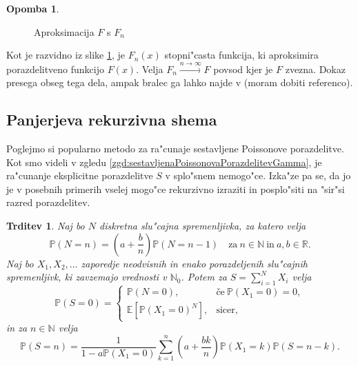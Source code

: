 \documentclass[12pt, a4paper, reqno]{amsart}
\theoremstyle{definition}
\newtheorem{opomba}[definicija]{Opomba}
\theoremstyle{plain}
\newtheorem{trditev}[definicija]{Trditev}
\newcommand{\R}{\mathbb{R}}
\newcommand{\N}{\mathbb{N}}
\newcommand{\E}{\mathbb{E}}
\newcommand{\Prob}{\mathbb{P}}
\newcommand{\1}{\mathds{1}}
\begin{document}
\begin{opomba}
\begin{figure}[H]
\begin{center}
\begin{tikzpicture}
                
                
                \end{tikzpicture}
                \caption{Aproksimacija $F$ s $F_n$}
                \label{fig:slika2}
            \end{center}
        \end{figure}

    \noindent
    Kot je razvidno iz slike \ref{fig:slika2}, je $F_n(x)$ stopni"casta funkcija, ki aproksimira 
    porazdelitveno funkcijo $F(x)$. Velja $F_n \xrightarrow{n\to\infty}F$ povsod kjer je $F$ zvezna.
    Dokaz presega obseg tega dela, ampak bralec ga lahko najde v \cite{4} (moram dobiti referenco).
    \label{op:aproksimacijaZDiskretno}
    \end{opomba}



    \subsection{Panjerjeva rekurzivna shema}
    Poglejmo si popularno metodo za ra"cunaje sestavljene Poissonove porazdelitve. Kot
    smo videli v zgledu \ref{zgd:sestavljenaPoissonovaPorazdelitevGamma}, je ra"cunanje eksplicitne 
    porazdelitve $S$ v splo"snem nemogo"ce. Izka"ze pa se, da jo je v posebnih primerih vselej mogo"ce
    rekurzivno izraziti in posplo"siti na "sir"si razred porazdelitev.

    \begin{trditev}
        Naj bo $N$ diskretna slu"cajna spremenljivka, za katero velja 
        \begin{equation*}
            \Prob(N = n) = \left(a + \frac{b}{n}\right)\Prob\left(N = n-1\right) \quad \text{za} \ n\in\N \ \text{in} \ a, b \in \R.
        \end{equation*}
        Naj bo $X_1, X_2, \dots$ zaporedje neodvisnih in enako porazdeljenih slu"cajnih spremenljivk, ki 
        zavzemajo vrednosti v $\N_0$. Potem za $S = \sum_{i=1}^NX_i$ velja
        \begin{equation*}
        \Prob\left(S = 0\right) = 
        \begin{cases}
            \Prob\left(N = 0\right), & \text{če} \ \Prob(X_1 = 0) = 0, \\  
            \E\left[\Prob\left(X_1 = 0\right)^N\right], & \text{sicer}, 
        \end{cases}
        \end{equation*}
        in za $n\in\N$ velja
        \begin{equation}
            \Prob\left(S = n\right) = \frac{1}{1 - a\Prob\left(X_1 = 0\right)}\sum_{k = 1}^n\left(a + \frac{bk}{n}\right)\Prob\left(X_1 = k\right)\Prob\left(S = n - k\right).
            \label{eq:PanjerRecursionScheme}
        \end{equation}
        \label{tdr:PanjerRecursionScheme}
    \end{trditev}
\end{document}
